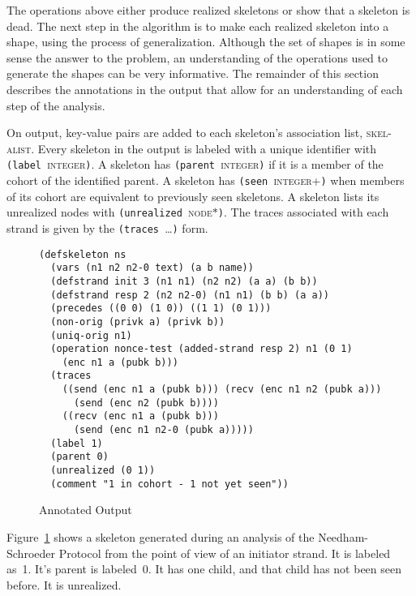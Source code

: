 \documentclass[12pt]{article}
\begin{document}
The operations above either produce realized skeletons or show that a
skeleton is dead.  The next step in the algorithm is to make each
realized skeleton into a shape, using the process of generalization.
Although the set of shapes is in some sense the answer to the problem,
an understanding of the operations used to generate the shapes can be
very informative.  The remainder of this section describes the
annotations in the output that allow for an understanding of each step
of the analysis.

On output, key-value pairs are added to each skeleton's association
list, \textsc{skel-alist}.  Every skeleton in the output is labeled
with a unique identifier with
\texttt{(label~}\textsc{integer}\texttt{)}.  A skeleton
has \texttt{(parent~}\textsc{integer}\texttt{)} if it is a member of
the cohort of the identified parent.  A skeleton has
\texttt{(seen~}\textsc{integer+}\texttt{)} when members of its cohort
are equivalent to previously seen skeletons.  A skeleton lists its
unrealized nodes with
\texttt{(unrealized~}\textsc{node$\ast$}\texttt{)}.  The traces
associated with each strand is given by the
\texttt{(traces~}\ldots\texttt{)} form.

\begin{figure}
\begin{verbatim}
(defskeleton ns
  (vars (n1 n2 n2-0 text) (a b name))
  (defstrand init 3 (n1 n1) (n2 n2) (a a) (b b))
  (defstrand resp 2 (n2 n2-0) (n1 n1) (b b) (a a))
  (precedes ((0 0) (1 0)) ((1 1) (0 1)))
  (non-orig (privk a) (privk b))
  (uniq-orig n1)
  (operation nonce-test (added-strand resp 2) n1 (0 1)
    (enc n1 a (pubk b)))
  (traces
    ((send (enc n1 a (pubk b))) (recv (enc n1 n2 (pubk a)))
      (send (enc n2 (pubk b))))
    ((recv (enc n1 a (pubk b)))
      (send (enc n1 n2-0 (pubk a)))))
  (label 1)
  (parent 0)
  (unrealized (0 1))
  (comment "1 in cohort - 1 not yet seen"))
\end{verbatim}
\caption{Annotated {\cpsa} Output}\label{fig:output}
\end{figure}

Figure~\ref{fig:output} shows a skeleton generated during an analysis
of the Needham-Schroeder Protocol from the point of view of an
initiator strand.  It is labeled as~1.  It's parent is labeled~0.  It
has one child, and that child has not been seen before.  It is
unrealized.
\end{document}
